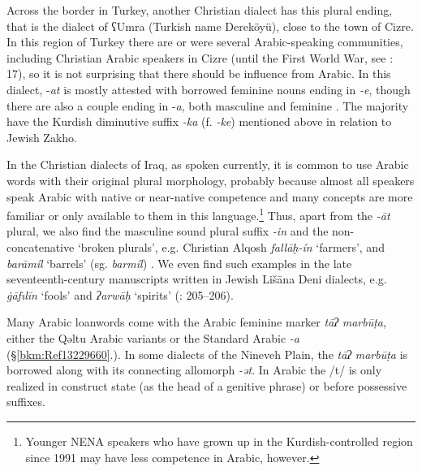 \documentclass[output=paper]{langsci/langscibook}
\begin{document}
Across the border in Turkey, another Christian dialect has this plural ending, that is the dialect of ʕUmra (Turkish name Dereköyü), close to the town of Cizre. In this region of Turkey there are or were several Arabic-speaking communities, including Christian Arabic speakers in Cizre (until the First World War, see \citealt{Jastrow1978}: 17), so it is not surprising that there should be influence from Arabic. In this dialect, \nobreakdash-\textit{at} is mostly attested with borrowed feminine nouns ending in \textit{\nobreakdash-e}, though there are also a couple ending in \nobreakdash-\textit{a}, both masculine and feminine \citep[114]{Hobrack2000}. The majority have the Kurdish diminutive suffix \textit{\nobreakdash-ka} (f. \textit{\nobreakdash-ke}) mentioned above in relation to Jewish Zakho.

In the Christian dialects of Iraq, as spoken currently, it is common to use Arabic words with their original plural morphology, probably because almost all speakers speak Arabic with native or near-native competence and many concepts are more familiar or only available to them in this language.\footnote{Younger NENA speakers who have grown up in the Kurdish-controlled region since 1991 may have less competence in Arabic, however.} Thus, apart from the \textit{\nobreakdash-āt} plural, we also find the masculine sound plural suffix \textit{{}-in} and the non-concatenative ‘broken plurals’, e.g. Christian Alqosh \textit{fallāḥ\nobreakdash-ín} ‘farmers’, and \textit{barāmíl} ‘barrels’ (sg. \textit{barmíl}) \citep[273]{Coghill2004}. We even find such examples in the late seventeenth-century manuscripts written in Jewish Lišāna Deni dialects, e.g. \textit{\.gāfılīn} ‘fools’ and \textit{ʔarwāḥ} ‘spirits’ (\citealt{Sabar1984}: 205–206).

Many Arabic loanwords come with the Arabic feminine marker \textit{tāʔ} \textit{marbūṭa}, either the Qəltu Arabic variants or the Standard Arabic \textit{\nobreakdash-a} (§\ref{bkm:Ref13229660}.). In some dialects of the Nineveh Plain, the \textit{tāʔ} \textit{marbūṭa} is borrowed along with its connecting allomorph \textit{{}-ət}. In Arabic the /t/ is only realized in construct state (as the head of a genitive phrase) or before possessive suffixes.
\end{document}
